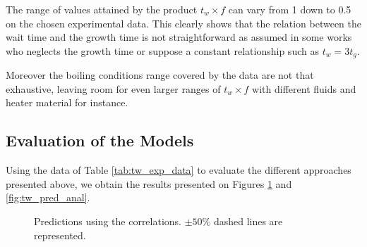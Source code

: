 \npar

\begin{remark*}{}
The range of values attained by the product $t_{w} \times f$ can vary from 1 down to 0.5 on the chosen experimental data. This clearly shows that the relation between the wait time and the growth time is not straightforward as assumed in some works who neglects the growth time or suppose a constant relationship such as $t_{w}=3t_{g}$\cite{chi-yeh_mechanism_1965}.

\npar
Moreover the boiling conditions range covered by the data are not that exhaustive, leaving room for even larger ranges of $t_{w} \times f$ with different fluids and heater material for instance.
\end{remark*}

\subsection{Evaluation of the Models}

Using the data of Table \ref{tab:tw_exp_data} to evaluate the different approaches presented above, we obtain the results presented on Figures \ref{fig:tw_pred_correl} and \ref{fig:tw_pred_anal}.


\begin{figure}[!h]
\centering
{}
\caption{Predictions using the correlations. $\pm 50\%$ dashed lines are represented.}
\label{fig:tw_pred_correl}
\end{figure}


